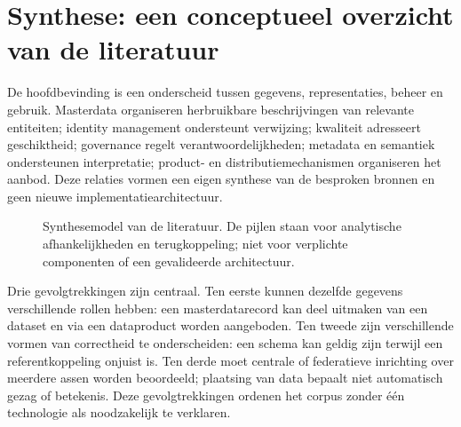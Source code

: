 \section{Synthese: een conceptueel overzicht van de literatuur}
De hoofdbevinding is een onderscheid tussen gegevens, representaties, beheer en gebruik. Masterdata organiseren herbruikbare beschrijvingen van relevante entiteiten; identity management ondersteunt verwijzing; kwaliteit adresseert geschiktheid; governance regelt verantwoordelijkheden; metadata en semantiek ondersteunen interpretatie; product- en distributiemechanismen organiseren het aanbod. Deze relaties vormen een eigen synthese van de besproken bronnen en geen nieuwe implementatiearchitectuur. \parencite{L20,L19,L07,S08,S47,L12}

\begin{figure}[htbp]
\centering
{}
\caption{Synthesemodel van de literatuur. De pijlen staan voor analytische afhankelijkheden en terugkoppeling; niet voor verplichte componenten of een gevalideerde architectuur.}
\end{figure}

Drie gevolgtrekkingen zijn centraal. Ten eerste kunnen dezelfde gegevens verschillende rollen hebben: een masterdatarecord kan deel uitmaken van een dataset en via een dataproduct worden aangeboden. Ten tweede zijn verschillende vormen van correctheid te onderscheiden: een schema kan geldig zijn terwijl een referentkoppeling onjuist is. Ten derde moet centrale of federatieve inrichting over meerdere assen worden beoordeeld; plaatsing van data bepaalt niet automatisch gezag of betekenis. Deze gevolgtrekkingen ordenen het corpus zonder één technologie als noodzakelijk te verklaren. \parencite{S47,L12,L22,S32,L24}

